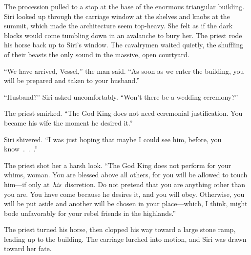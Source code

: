 The procession pulled to a stop at the base of the enormous triangular building. Siri looked up through the carriage window at the shelves and knobs at the summit, which made the architecture seem top-heavy. She felt as if the dark blocks would come tumbling down in an avalanche to bury her. The priest rode his horse back up to Siri’s window. The cavalrymen waited quietly, the shuffling of their beasts the only sound in the massive, open courtyard.

“We have arrived, Vessel,” the man said. “As soon as we enter the building, you will be prepared and taken to your husband.”

“Husband?” Siri asked uncomfortably. “Won’t there be a wedding ceremony?”

The priest smirked. “The God King does not need ceremonial justification. You became his wife the moment he desired it.”

Siri shivered. “I was just hoping that maybe I could see him, before, you know~.~.~.”

The priest shot her a harsh look. “The God King does not perform for your whims, woman. You are blessed above all others, for you will be allowed to touch him—if only at~\textit{his}~discretion. Do not pretend that you are anything other than you are. You have come because he desires it, and you will obey. Otherwise, you will be put aside and another will be chosen in your place—which, I think, might bode unfavorably for your rebel friends in the highlands.”

The priest turned his horse, then clopped his way toward a large stone ramp, leading up to the building. The carriage lurched into motion, and Siri was drawn toward her fate.


